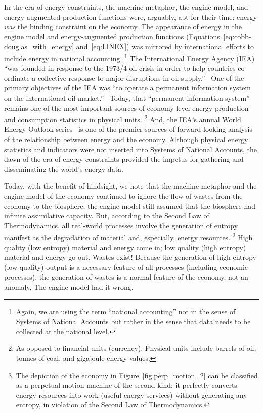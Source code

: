 In the era of energy constraints, 
the machine metaphor, 
the engine model, 
and energy-augmented production functions 
were, arguably, apt for their time:
energy \emph{was} the binding constraint on the economy.
The appearance of energy in the engine model and
energy-augmented production functions 
(Equations~\ref{eq:cobb-douglas_with_energy} and~\ref{eq:LINEX})
was mirrored by international efforts 
to include energy in national accounting.%
	\footnote{
	Again, we are using the term ``national accounting''
	not in the sense of Systems of National Accounts 
	but rather in the sense that data needs to be collected
	at the national level.
	}
The International Energy Agency (IEA) 
``was founded in response to the 1973/4 oil crisis 
in order to help countries co-ordinate a collective response 
to major disruptions in oil supply.''~\cite{International-Energy-Agency:2014aa}
One of the primary objectives of the IEA was
``to operate a permanent information system 
on the international oil market.''~\cite{International-Energy-Agency:2014aa}
Today, that ``permanent information system''~\cite{International-Energy-Agency:2014ab}
remains one of the most important 
sources of economy-level energy production and consumption
statistics in physical units.%
	\footnote{
	As opposed to financial units (currency).
	Physical units include barrels of oil, tonnes of coal, and gigajoule energy values.
	}
And, the IEA's annual World Energy Outlook 
series~\cite{International-Energy-Agency:2014ac} is 
one of the premier sources
of forward-looking analysis of the relationship between energy and the economy.
Although physical energy statistics and indicators
were not inserted into Systems of National Accounts,
the dawn of the era of energy constraints provided the impetus 
for gathering and disseminating the world's energy data.

Today, with the benefit of hindsight, 
we note that the machine metaphor and the engine model of the economy
continued to ignore the flow of wastes from the economy to the biosphere;
the engine model still assumed that the biosphere had infinite assimilative capacity.
But, according to the Second Law of Thermodynamics, 
all real-world processes involve 
the generation of entropy
manifest as the degradation 
of material and, especially, energy resources.%
	\footnote{
	The depiction of the economy in Figure~\ref{fig:perp_motion_2} 
	can be classified as a perpetual motion machine of the second kind: 
	it perfectly converts energy resources into work (useful energy services) 
	without generating any entropy, 
	in violation of the Second Law of Thermodynamics. 	
	}
High quality (low entropy) material and energy come in; 
low quality (high entropy) material and energy go out. 
Wastes exist!
Because the generation of high entropy (low quality) output 
is a necessary feature of all processes (including economic processes), 
the generation of wastes is a normal feature of the economy, 
not an anomaly. 
The engine model had it wrong.

